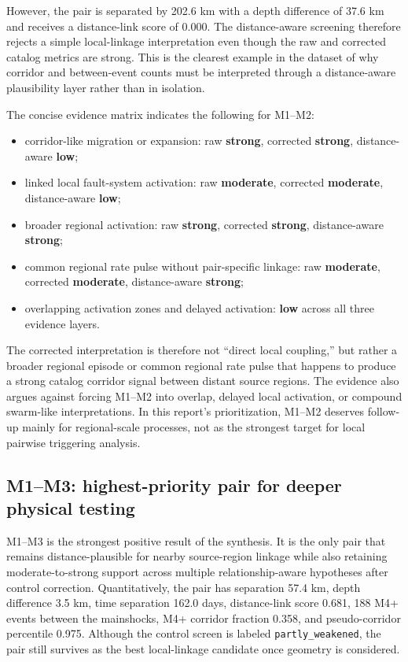 \documentclass[11pt]{article}
\begin{document}
However, the pair is separated by 202.6 km with a depth difference of 37.6 km and receives a distance-link score of 0.000. The distance-aware screening therefore rejects a simple local-linkage interpretation even though the raw and corrected catalog metrics are strong. This is the clearest example in the dataset of why corridor and between-event counts must be interpreted through a distance-aware plausibility layer rather than in isolation.

The concise evidence matrix indicates the following for M1--M2:
\begin{itemize}
    \item corridor-like migration or expansion: raw \textbf{strong}, corrected \textbf{strong}, distance-aware \textbf{low};
    \item linked local fault-system activation: raw \textbf{moderate}, corrected \textbf{moderate}, distance-aware \textbf{low};
    \item broader regional activation: raw \textbf{strong}, corrected \textbf{strong}, distance-aware \textbf{strong};
    \item common regional rate pulse without pair-specific linkage: raw \textbf{moderate}, corrected \textbf{moderate}, distance-aware \textbf{strong};
    \item overlapping activation zones and delayed activation: \textbf{low} across all three evidence layers.
\end{itemize}

The corrected interpretation is therefore not ``direct local coupling,'' but rather a broader regional episode or common regional rate pulse that happens to produce a strong catalog corridor signal between distant source regions. The evidence also argues against forcing M1--M2 into overlap, delayed local activation, or compound swarm-like interpretations. In this report's prioritization, M1--M2 deserves follow-up mainly for regional-scale processes, not as the strongest target for local pairwise triggering analysis.

\subsection{M1--M3: highest-priority pair for deeper physical testing}
M1--M3 is the strongest positive result of the synthesis. It is the only pair that remains distance-plausible for nearby source-region linkage while also retaining moderate-to-strong support across multiple relationship-aware hypotheses after control correction. Quantitatively, the pair has separation 57.4 km, depth difference 3.5 km, time separation 162.0 days, distance-link score 0.681, 188 M4+ events between the mainshocks, M4+ corridor fraction 0.358, and pseudo-corridor percentile 0.975. Although the control screen is labeled \texttt{partly\_weakened}, the pair still survives as the best local-linkage candidate once geometry is considered.
\end{document}
